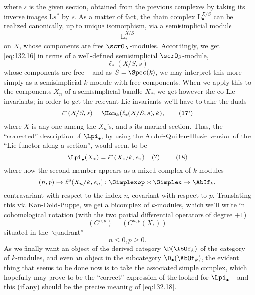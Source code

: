 where $s$ is the given section, obtained from the previous complexes
by taking its inverse images $\mathrm Ls^*$ by $s$. As a matter of
fact, the chain complex $\mathrm L_\bullet^{X/S}$ can be realized
canonically, up to unique isomorphism, via a semisimplicial module
\[\mathrm L_*^{X/S}\]
on $X$, whose components are free $\scrO_X$-modules. Accordingly, we
get \eqref{eq:132.16} in terms of a well-defined semisimplicial
$\scrO_S$-module,
\begin{equation}
  \label{eq:132.17}
  \ell_*(X/S,s)\tag{17}
\end{equation}
whose components are free -- and as $S=\Spec(k)$, we may interpret
this more simply as a semisimplicial $k$-module with free
components. When we apply this to the components $X_n$ of a
semisimplicial bundle $X_*$, we get however the co-Lie invariants; in
order to get the relevant Lie invariants we'll have to take the duals
\begin{equation}
  \label{eq:132.17prime}
  \ell^*(X/S,s) = \Hom_k(\ell_*(X/S,s),k),\tag{17'}
\end{equation}
where $X$ is any one among the $X_n$'s, and $s$ its marked
section. Thus, the ``corrected'' description of $\Lpi_\bullet$, by
using the André-Quillen-Illusie version of the ``Lie-functor along a
section'', would seem to be
\begin{equation}
  \label{eq:132.18}
  \Lpi_\bullet(X_*) = \ell^*(X_*/k,e_*)\quad
  \text{(?),} \tag{18}
\end{equation}
where now the second member appears as a mixed complex of
$k$-modules
\[(n,p) \mapsto \ell^p(X_n/k,e_n) : \Simplexop\times\Simplex \to
\AbOf_k,\]
contravariant with respect to the index $n$, covariant with respect to
$p$. Translating this via Kan-Dold-Puppe, we get a bicomplex of
$k$-modules, which we'll write in cohomological notation (with the two
partial differential operators of degree $+1$)
\[(C^{n,p}) = (C^{n,p}(X_*))\]
situated in the ``quadrant''
\[n\le 0, p\ge 0.\]
As we finally want an object of the derived category $\D(\AbOf_k)$ of
the category of $k$-modules, and even an object in the subcategory
$\D_\bullet(\AbOf_k)$, the evident thing that seems to be done now is
to take the associated simple complex, which hopefully may prove to be
the ``correct'' expression of the looked-for $\Lpi_\bullet$ -- and
this (if any) should be the precise meaning of \eqref{eq:132.18}.

